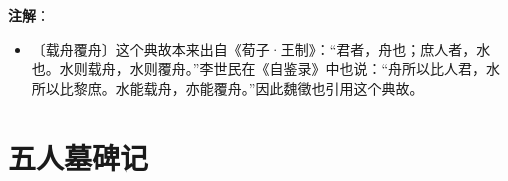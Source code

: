 \documentclass[12pt,UTF-8,openany,a4]{ctexbook}
\begin{document}
\begin{Large}
   \noindent \textbf{注解}：
\end{Large}

\vspace{-1em}

\begin{itemize}
    \setlength\itemsep{-0.2em}
    \item〔载舟覆舟〕{\yiwen 这个典故本来出自《荀子·王制》：“君者，舟也；庶人者，水也。水则载舟，水则覆舟。”李世民在《自鉴录》中也说：“舟所以比人君，水所以比黎庶。水能载舟，亦能覆舟。”因此魏徵也引用这个典故。}
\end{itemize}

\chapter{五人墓碑记}
\end{document}
